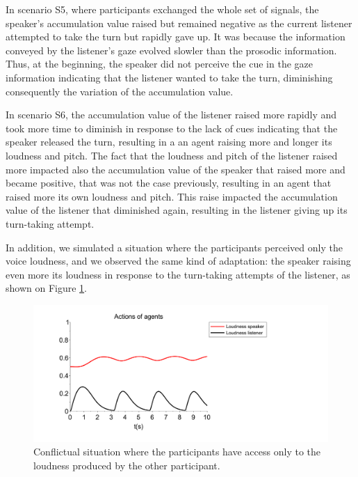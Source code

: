 In scenario S5, where participants exchanged the whole set of signals, the speaker's accumulation value raised but remained negative as the current listener attempted to take the turn but rapidly gave up. It was because the information conveyed by the listener's gaze evolved slowler than the prosodic information. Thus, at the beginning, the speaker did not perceive the cue in the gaze information indicating that the listener wanted to take the turn, diminishing consequently the variation of the accumulation value. 

In scenario S6, the accumulation value of the listener raised more rapidly and took more time to diminish in response to the lack of cues indicating that the speaker released the turn, resulting in a an agent raising more and longer its loudness and pitch. The fact that the loudness and pitch of the listener raised more impacted also the accumulation value of the speaker that raised more and became positive, that was not the case previously, resulting in an agent that raised more its own loudness and pitch. This raise impacted the accumulation value of the listener that diminished again, resulting in the listener giving up its turn-taking attempt. 

In addition, we simulated a situation where the participants perceived only the voice loudness, and we observed the same kind of adaptation: the speaker raising even more its loudness in response to the turn-taking attempts of the listener, as shown on Figure \ref{adapt_volume}.

\begin{figure}
  \centering
  \includegraphics[width=\linewidth]{figure/adapt_volume.pdf}
  \caption{Conflictual situation where the participants have access only to the loudness produced by the other participant.}
  \label{adapt_volume}
\end{figure}

